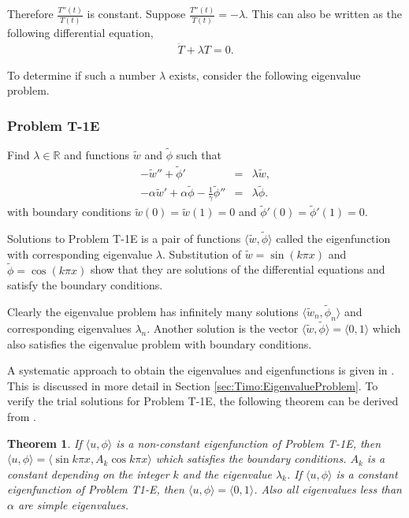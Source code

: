 \documentclass[../../main.tex]{subfiles}
\begin{document}
Therefore $\displaystyle \frac{T''(t)}{T(t)}$ is constant. Suppose $\displaystyle \frac{T''(t)}{T(t)} = -\lambda$. This can also be written as the following differential equation,
\begin{eqnarray}
	\ddot{T} + \lambda T = 0. \label{eq:1D_Model:ModalAnalysisT}
\end{eqnarray}

To determine if such a number $\lambda$ exists, consider the following eigenvalue problem.
\subsubsection*{Problem T-1E}\label{sssec:1D_Model:Problem:T1E}
Find $\lambda \in \mathbb{R}$ and functions $\tilde{w}$ and $\tilde{\phi}$ such that
\begin{eqnarray*}
	-\tilde{w}'' + \tilde{\phi}' &=& \lambda \tilde{w}, \label{eq:1D_Model:ProblemT1E1}\\
	-\alpha \tilde{w}' + \alpha\tilde{\phi} - \frac{1}{\gamma}\tilde{\phi}'' &=& \lambda \tilde{\phi}. \label{eq:1D_Model:ProblemT1E2}
\end{eqnarray*} with boundary conditions $\tilde{w}(0) = \tilde{w}(1) = 0$ and $\tilde{\phi}'(0) = \tilde{\phi}'(1) = 0$.

Solutions to Problem T-1E is a pair of functions $\langle \tilde{w}, \tilde{\phi} \rangle$ called the eigenfunction with corresponding eigenvalue $\lambda$. Substitution of $\tilde{w} = \sin(k\pi x)$ and $\tilde{\phi} = \cos(k \pi x)$ show that they are solutions of the differential equations and satisfy the boundary conditions.

Clearly the eigenvalue problem has infinitely many solutions $\langle \tilde{w}_n, \tilde{\phi}_n \rangle$ and corresponding eigenvalues $\lambda_n$. Another solution is the vector $\langle \tilde{w}, \tilde{\phi} \rangle= \langle 0, 1 \rangle$ which also satisfies the eigenvalue problem with boundary conditions.

A systematic approach to obtain the eigenvalues and eigenfunctions is given in \cite{VV06}. This is discussed in more detail in Section \ref{sec:Timo:EigenvalueProblem}. To verify the trial solutions for Problem T-1E, the following theorem can be derived from \cite{VV06}.

\newtheorem{ThmVV06}{Theorem}
\begin{ThmVV06}
	If $\langle u, \phi\rangle$ is a non-constant eigenfunction of Problem T-1E, then $\langle u, \phi\rangle = \langle\sin k \pi x, A_k \cos k \pi x\rangle$ which satisfies the boundary conditions. $A_k$ is a constant depending on the integer $k$ and the eigenvalue $\lambda_k$. If $\langle u, \phi\rangle$ is a constant eigenfunction of Problem T1-E, then  $\langle u, \phi\rangle = \langle 0, 1 \rangle$. Also all eigenvalues less than $\alpha$ are simple eigenvalues.
\end{ThmVV06}
\end{document}

